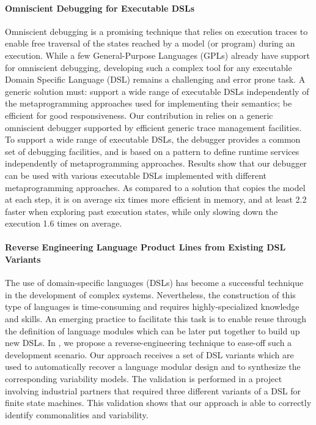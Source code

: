 \paragraph{Omniscient Debugging for Executable DSLs}

Omniscient debugging is a promising technique that relies on execution traces to enable free traversal of the states reached by a model (or program) during an execution. While a few General-Purpose Languages (GPLs) already have support for omniscient debugging, developing such a complex tool for any executable Domain Specific Language (DSL) remains a challenging and error prone task. A generic solution must: support a wide range of executable DSLs independently of the metaprogramming approaches used for implementing their semantics; be efficient for good responsiveness. Our contribution in \cite{bousse:hal-01662336} relies on a generic omniscient debugger supported by efficient generic trace management facilities. To support a wide range of executable DSLs, the debugger provides a common set of debugging facilities, and is based on a pattern to define runtime services independently of metaprogramming approaches. Results show that our debugger can be used with various executable DSLs implemented with different metaprogramming approaches. As compared to a solution that copies the model at each step, it is on average six times more efficient in memory, and at least 2.2 faster when exploring past execution states, while only slowing down the execution 1.6 times on average.

\paragraph{Reverse Engineering Language Product Lines from Existing DSL Variants}

The use of domain-specific languages (DSLs) has become a successful technique in the development of complex systems. Nevertheless, the construction of this type of languages is time-consuming and requires highly-specialized knowledge and skills. An emerging practice to facilitate this task is to enable reuse through the definition of language modules which can be later put together to build up new DSLs. 
In \cite{mendezacuna:hal-01524632}, we propose a reverse-engineering technique to ease-off such a development scenario. Our approach receives a set of DSL variants which are used to automatically recover a language modular design and to synthesize the corresponding variability models. The validation is performed in a project involving industrial partners that required three different variants of a DSL for finite state machines. This validation shows that our approach is able to correctly identify commonalities and variability.


